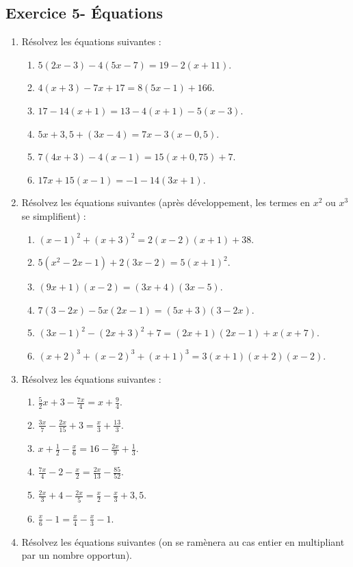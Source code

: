 \documentclass[12 pt]{extarticle}
\theoremstyle{plain}
\begin{document}
\subsection*{Exercice 5- Équations}

\begin{enumerate}
\item Résolvez les équations suivantes : 
\begin{enumerate}
\item $5(2x-3) - 4(5x-7)=19-2(x+11)$. 
\item $4(x+3)-7x+17 = 8(5x-1)+166$. 
\item $17-14(x+1)= 13-4(x+1)-5(x-3)$. 
\item $5x+3,5+(3x-4) = 7x-3(x-0,5)$. 
\item $7(4x+3)-4(x-1)=15(x+0,75)+7$. 
\item $17x+15(x-1)=-1-14(3x+1)$. 
\end{enumerate}
\item Résolvez les équations suivantes (après développement, les termes en $x^2$ ou $x^3$ se simplifient) : 
\begin{enumerate}
\item $(x-1)^2+(x+3)^2= 2(x-2)(x+1)+38$.
\item $5(x^2-2x-1)+2(3x-2)=5(x+1)^2$.
\item $(9x+1)(x-2)=(3x+4)(3x-5)$.
\item $7(3-2x)-5x(2x-1)=(5x+3)(3-2x)$. 
\item $(3x-1)^2-(2x+3)^2+7 = (2x+1)(2x-1) + x(x+7)$.
\item $(x+2)^3+(x-2)^3+(x+1)^3=3(x+1)(x+2)(x-2)$.
\end{enumerate}
\item Résolvez les équations suivantes : 
\begin{enumerate}
\item $\frac52x+3 - \frac{7x}4 = x + \frac94$. 
\item $\frac{3x}7 - \frac{2x}{15} + 3 = \frac{x}3+\frac{13}3$.
\item $x+\frac12-\frac{x}6 = 16 - \frac{2x}9 + \frac13$. 
\item $\frac{7x}4-2-\frac{x}2=\frac{2x}{13}-\frac{85}{52}$. 
\item $\frac{2x}3+4 -\frac{2x}5 = \frac{x}2-\frac{x}3+3,5$. 
\item $\frac{x}6-1=\frac{x}4-\frac{x}3-1$. 
\end{enumerate}
\item Résolvez les équations suivantes (on se ramènera au cas entier en multipliant par un nombre opportun).

\end{enumerate}
\end{document}
